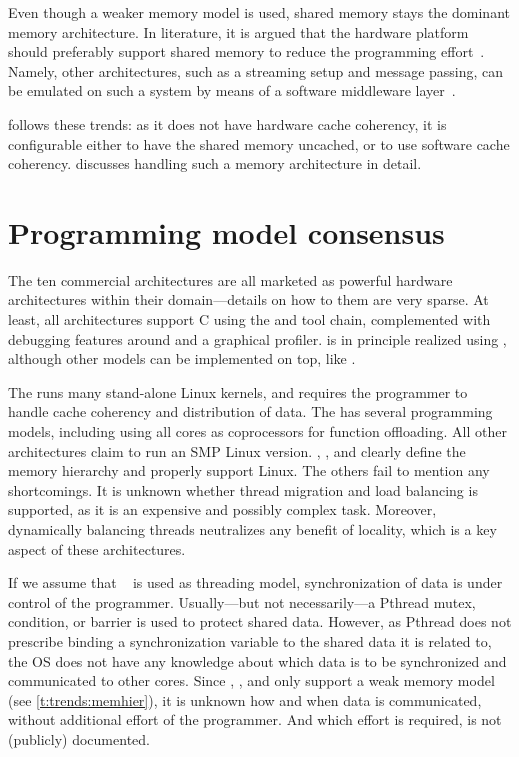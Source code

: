 Even though a weaker memory model is used, shared memory stays the dominant memory architecture.
In literature, it is argued that the hardware platform should preferably support shared memory to reduce the programming effort~\cite{dagum:openmp,kranz:mp_and_shmem}.
Namely, other architectures, such as a streaming setup and message passing, can be emulated on such a system by means of a software middleware layer~\cite{dagum:openmp,kranz:mp_and_shmem,wolf:interface_centric,culler:comp_arch}.

\Starburst follows these trends: as it does not have hardware cache coherency, it is configurable either to have the shared memory uncached, or to use software cache coherency.
 discusses handling such a memory architecture in detail.


\section{Programming model consensus}
\label{s:trends:progmodel}

The ten commercial architectures are all marketed as powerful hardware architectures within their domain---details on how to  them are very sparse.
At least, all architectures support C using the  and  tool chain, complemented with debugging features around  and a graphical profiler.
 is in principle realized using , although other models can be implemented on top, like .

The \IntelSCC runs many stand-alone Linux kernels, and requires the programmer to handle cache coherency and distribution of data.
The \XeonPhi has several programming models, including using all cores as coprocessors for function offloading.
All other architectures claim to run an \ac{SMP} Linux version.
\UltraSPARC, \Inteliseven, and \POWERseven clearly define the memory hierarchy and properly support Linux.
The others fail to mention any shortcomings.
It is unknown whether thread migration and load balancing is supported, as it is an expensive and possibly complex task.
Moreover, dynamically balancing threads neutralizes any benefit of locality, which is a key aspect of these architectures.

If we assume that ~\cite{Pthread} is used as threading model, synchronization of data is under control of the programmer.
Usually---but not necessarily---a Pthread mutex, condition, or barrier is used to protect shared data.
However, as Pthread does not prescribe binding a synchronization variable to the shared data it is related to, the \ac{OS} does not have any knowledge about which data is to be synchronized and communicated to other cores.
Since \TILEGx, \OCTEON, and \Exynos only support a weak memory model (see \vref{t:trends:memhier}), it is unknown how and when data is communicated, without additional effort of the programmer.
And which effort is required, is not (publicly) documented.

